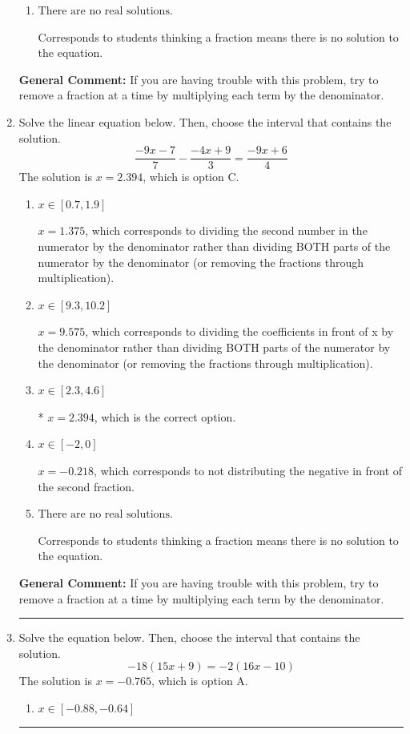 \documentclass{extbook}[14pt]
\newcommand{\litem}[1]{\item #1

\rule{\textwidth}{0.4pt}}
\begin{document}
\begin{enumerate}
{\begin{enumerate}[label=\Alph*.]
 $x = 1.091$, which corresponds to not distributing the negative in front of the second fraction.
\item \( \text{There are no real solutions.} \)

Corresponds to students thinking a fraction means there is no solution to the equation.
\end{enumerate}

\textbf{General Comment:} If you are having trouble with this problem, try to remove a fraction at a time by multiplying each term by the denominator.
}
\litem{
Solve the linear equation below. Then, choose the interval that contains the solution.
\[ \frac{-9x -7}{7} - \frac{-4x + 9}{3} = \frac{-9x + 6}{4} \]The solution is \( x = 2.394 \), which is option C.\begin{enumerate}[label=\Alph*.]
\item \( x \in [0.7, 1.9] \)

 $x = 1.375$, which corresponds to dividing the second number in the numerator by the denominator rather than dividing BOTH parts of the numerator by the denominator (or removing the fractions through multiplication).
\item \( x \in [9.3, 10.2] \)

 $x = 9.575$, which corresponds to dividing the coefficients in front of x by the denominator rather than dividing BOTH parts of the numerator by the denominator (or removing the fractions through multiplication).
\item \( x \in [2.3, 4.6] \)

* $x = 2.394$, which is the correct option.
\item \( x \in [-2, 0] \)

 $x = -0.218$, which corresponds to not distributing the negative in front of the second fraction.
\item \( \text{There are no real solutions.} \)

Corresponds to students thinking a fraction means there is no solution to the equation.
\end{enumerate}

\textbf{General Comment:} If you are having trouble with this problem, try to remove a fraction at a time by multiplying each term by the denominator.
}
\litem{
Solve the equation below. Then, choose the interval that contains the solution.
\[ -18(15x + 9) = -2(16x -10) \]The solution is \( x = -0.765 \), which is option A.\begin{enumerate}[label=\Alph*.]
\item \( x \in [-0.88, -0.64] \)


\end{enumerate}}
\end{enumerate}
\end{document}
